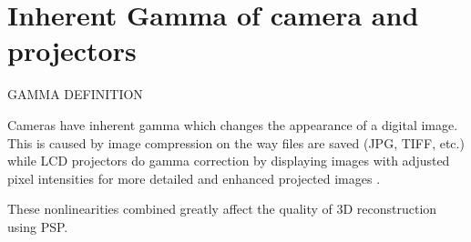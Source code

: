 \section{Inherent Gamma of camera and projectors}


GAMMA DEFINITION

Cameras have inherent gamma which changes the appearance of a digital image. This is caused by image compression on the way files are saved (JPG, TIFF, etc.) while LCD projectors do gamma correction by displaying images with adjusted pixel intensities for more detailed and enhanced projected images \cite{gamma_correction}. 


These nonlinearities combined greatly affect the quality of 3D reconstruction using PSP.
